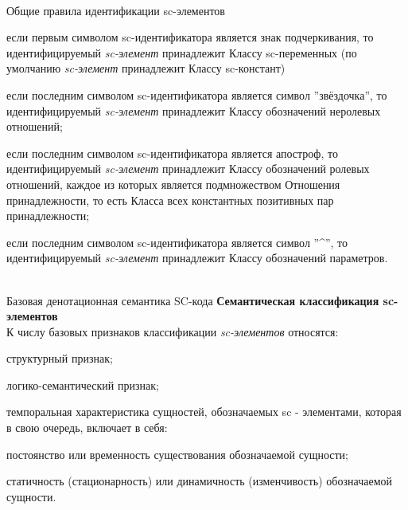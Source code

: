 \begin{frame}{\\Общие правила идентификации sc-элементов}
	\topline
	\justifying
	\vspace{10mm}
	\begin{SCn}
		\begin{textitemize}
			\item если первым символом sc-идентификатора является знак подчеркивания, то идентифицируемый \textit{sc-элемент} принадлежит Классу sc-переменных (по умолчанию \textit{sc-элемент} принадлежит Классу sc-констант)
			\item если последним символом sc-идентификатора является символ ''звёздочка'', то идентифицируемый \textit{sc-элемент} принадлежит Классу обозначений неролевых отношений;
			\item если последним символом sc-идентификатора является апостроф, то идентифицируемый \textit{sc-элемент} принадлежит Классу обозначений ролевых отношений, каждое из которых является подмножеством Отношения принадлежности, то есть Класса всех константных позитивных пар принадлежности;
			\item если последним символом sc-идентификатора является символ ''\textasciicircum'', то идентифицируемый \textit{sc-элемент} принадлежит Классу обозначений параметров.
		\end{textitemize}
	\end{SCn}
\end{frame}

\begin{frame}{\\Базовая денотационная семантика SC-кода}
	\topline
	\justifying 
	\textbf{Семантическая классификация sc-элементов}\\
	К числу базовых признаков классификации \textit{sc-элементов} относятся:
	\begin{textitemize}
		\item структурный признак;
		\item логико-семантический признак;
		\item темпоральная характеристика сущностей, обозначаемых sc - элементами, которая в свою очередь, включает в себя:
		\begin{textitemize}
			\item постоянство или временность существования обозначаемой сущности;
			\item статичность (стационарность) или динамичность (изменчивость) обозначаемой сущности.
		\end{textitemize}
	\end{textitemize}
\end{frame}

